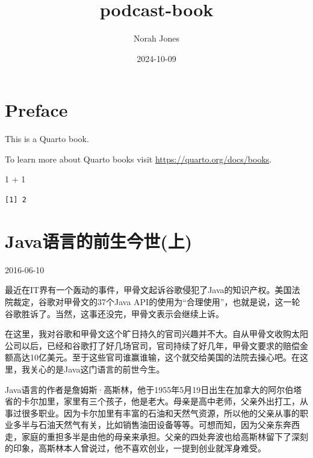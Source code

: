 \documentclass[
  letterpaper,
  DIV=11,
  numbers=noendperiod]{scrreprt}
\title{podcast-book}
\author{Norah Jones}
\date{2024-10-09}
\newenvironment{Shaded}{\begin{snugshade}}{\end{snugshade}}
\newcommand{\DecValTok}[1]{\textcolor[rgb]{0.68,0.00,0.00}{#1}}
\newcommand{\SpecialCharTok}[1]{\textcolor[rgb]{0.37,0.37,0.37}{#1}}
\renewcommand*\contentsname{Table of contents}
\newcommand\contentsname{Table of contents}
\begin{document}
\maketitle

\renewcommand*\contentsname{Table of contents}
{
\hypersetup{linkcolor=}
\setcounter{tocdepth}{2}
\tableofcontents
}


\chapter*{Preface}\label{preface}


This is a Quarto book.

To learn more about Quarto books visit
\url{https://quarto.org/docs/books}.

\begin{Shaded}
\begin{Highlighting}[]
\DecValTok{1} \SpecialCharTok{+} \DecValTok{1}
\end{Highlighting}
\end{Shaded}

\begin{verbatim}
[1] 2
\end{verbatim}


\chapter{Java语言的前生今世(上)}\label{javaux8bedux8a00ux7684ux524dux751fux4ecaux4e16ux4e0a}

2016-06-10

最近在IT界有一个轰动的事件，甲骨文起诉谷歌侵犯了Java的知识产权。美国法院裁定，谷歌对甲骨文的37个Java
API的使用为``合理使用''，也就是说，这一轮谷歌胜诉了。当然，这事还没完，甲骨文表示会继续上诉。

在这里，我对谷歌和甲骨文这个旷日持久的官司兴趣并不大。自从甲骨文收购太阳公司以后，已经和谷歌打了好几场官司，官司持续了好几年，甲骨文要求的赔偿金额高达10亿美元。至于这些官司谁赢谁输，这个就交给美国的法院去操心吧。在这里，我关心的是Java这门语言的前世今生。

Java语言的作者是詹姆斯·高斯林，他于1955年5月19日出生在加拿大的阿尔伯塔省的卡尔加里，家里有三个孩子，他是老大。母亲是高中老师，父亲外出打工，从事过很多职业。因为卡尔加里有丰富的石油和天然气资源，所以他的父亲从事的职业多半与石油天然气有关，比如销售油田设备等等。可想而知，因为父亲东奔西走，家庭的重担多半是由他的母亲来承担。父亲的四处奔波也给高斯林留下了深刻的印象，高斯林本人曾说过，他不喜欢创业，一提到创业就浑身难受。
\end{document}
